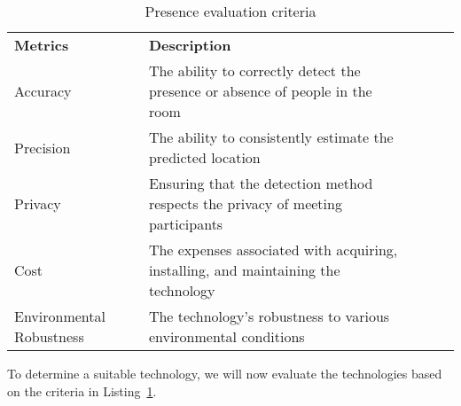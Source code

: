 \begin{table}[]
    \begin{tabular}{|l|p{95mm}|lll}
    \cline{1-2}
    \textbf{Metrics} & \textbf{Description}                                                               &  &  &  \\ \cline{1-2}
    Accuracy         & The ability to correctly detect the presence or absence of people in the room      &  &  &  \\ \cline{1-2}
    Precision        & The ability to consistently estimate the predicted location                           &  &  &  \\ \cline{1-2}
    Privacy          & Ensuring that the detection method respects the privacy of meeting participants    &  &  &  \\ \cline{1-2}
    Cost             & The expenses associated with acquiring, installing, and maintaining the technology &  &  &  \\ \cline{1-2}
    Environmental Robustness    & The technology's robustness to various environmental conditions                    &  &  &  \\ \cline{1-2}
    \end{tabular}
    \caption{Presence evaluation criteria}
    \label{lst:presence_eval_criteria}
\end{table}

To determine a suitable technology, we will now evaluate the technologies based on the criteria in Listing~\ref{lst:presence_eval_criteria}.